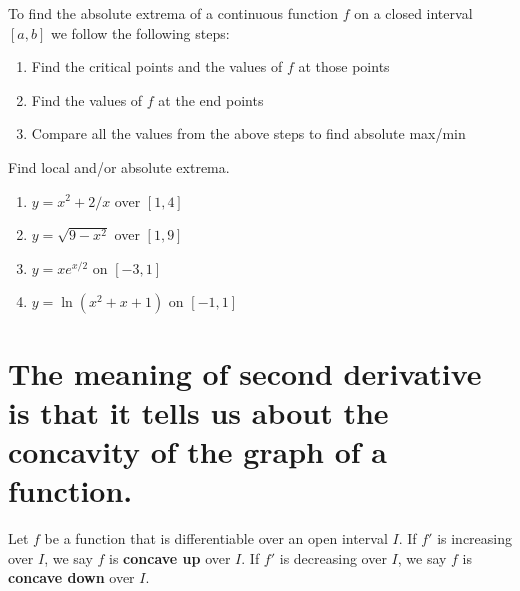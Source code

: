 \documentclass[12pt]{amsart}
\begin{document}
\begin{theorem}
	To find the absolute extrema of a continuous function $f$ on a closed interval $[a,b]$ we follow the
	following steps:
	\begin{enumerate}
		\item Find the critical points and the values of $f$ at those points
		\item Find the values of $f$ at the end points
		\item Compare all the values from the above steps to find absolute max/min
	\end{enumerate}

\end{theorem}


\begin{question}
	Find local and/or absolute extrema.
	\begin{enumerate}
		\item $y = x^2 + 2/x$ over $[1,4]$
		      \vspace{5cm}
		\item $y = \sqrt{9 - x^2}$ over $[1,9]$
		      \vspace{5cm}
		\item $y = x e^{x/2}$ on $[-3,1]$
		      \vspace{5cm}
		\item $y = \ln( x^2 + x +1) $ on $[-1,1]$
	\end{enumerate}
\end{question}


\newpage



\section*{ The meaning of second derivative is that it tells us about the concavity of the graph of a function.}

\begin{definition}
	Let \( f \) be a function that is differentiable over an open interval \( I \). If \( f' \) is increasing over \( I \), we say \( f \) is \textbf{concave up} over \( I \). If \( f' \) is decreasing over \( I \), we say \( f \) is \textbf{concave down} over \( I \).
\end{definition}
\end{document}
